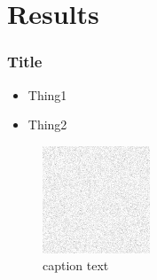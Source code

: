 \section{Results}

\begin{frame}
	\frametitle{Title}
	\begin{itemize}
		\item Thing1
		\item Thing2
	\end{itemize}
	\begin{figure}[h]
		\includegraphics[height=0.5\textheight]{images/img.png}
		\caption{caption text}
	\end{figure}
\end{frame}
